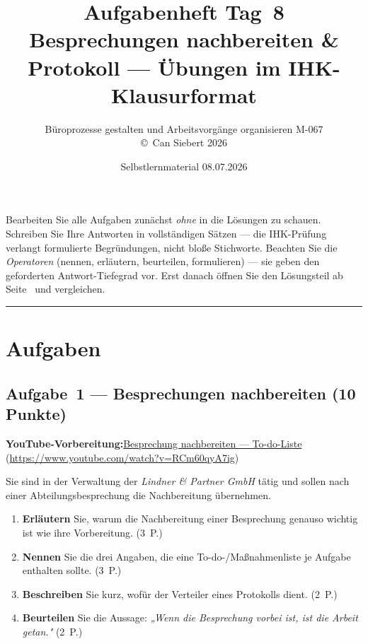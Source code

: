 \documentclass[11pt, a4paper]{article}
\title{\vspace*{-1.5cm}\Huge\bfseries\color{bfwPrimaryDark}Aufgabenheft Tag~8\\[0.4em]
  \large\color{bfwInkSoft}\textnormal{Besprechungen nachbereiten \& Protokoll --- Übungen im IHK-Klausurformat}}
\author{\textsf{Büroprozesse gestalten und Arbeitsvorgänge organisieren \textperiodcentered{} M-067}\\
\textsf{\small\copyright\ Can Siebert\,\textperiodcentered\,2026}}
\date{Selbstlernmaterial \textperiodcentered{} 08.07.2026}
\begin{document}
\maketitle
\thispagestyle{empty}

\begin{merksatz}[title={\bfseries So nutzen Sie dieses Aufgabenheft}]
Bearbeiten Sie alle Aufgaben zunächst \emph{ohne} in die Lösungen zu schauen. Schreiben
Sie Ihre Antworten in vollständigen Sätzen --- die IHK-Prüfung verlangt formulierte
Begründungen, nicht bloße Stichworte. Beachten Sie die \emph{Operatoren} (nennen,
erläutern, beurteilen, formulieren) --- sie geben den geforderten Antwort-Tiefegrad vor.
Erst danach öffnen Sie den Lösungsteil ab Seite~\pageref{loesungen} und vergleichen.
\end{merksatz}

\tableofcontents
\vspace{1em}
\hrule

\section{Aufgaben}

\subsection*{Aufgabe~1 --- Besprechungen nachbereiten (10 Punkte)}

\noindent\textbf{\color{bfwAccent}YouTube-Vorbereitung:}\enspace \href{https://www.youtube.com/watch?v=RCm60qyA7ig}{Besprechung nachbereiten --- To-do-Liste} (\url{https://www.youtube.com/watch?v=RCm60qyA7ig})

\medskip
Sie sind in der Verwaltung der \emph{Lindner \& Partner GmbH} tätig und sollen nach einer
Abteilungsbesprechung die Nachbereitung übernehmen.

\begin{enumerate}[label=(\alph*)]
  \item \textbf{Erläutern} Sie, warum die Nachbereitung einer Besprechung genauso wichtig ist wie ihre Vorbereitung. \hfill (3~P.)
  \item \textbf{Nennen} Sie die drei Angaben, die eine To-do-/Maßnahmenliste je Aufgabe enthalten sollte. \hfill (3~P.)
  \item \textbf{Beschreiben} Sie kurz, wofür der Verteiler eines Protokolls dient. \hfill (2~P.)
  \item \textbf{Beurteilen} Sie die Aussage: \emph{„Wenn die Besprechung vorbei ist, ist die Arbeit getan."} \hfill (2~P.)
\end{enumerate}
\end{document}
